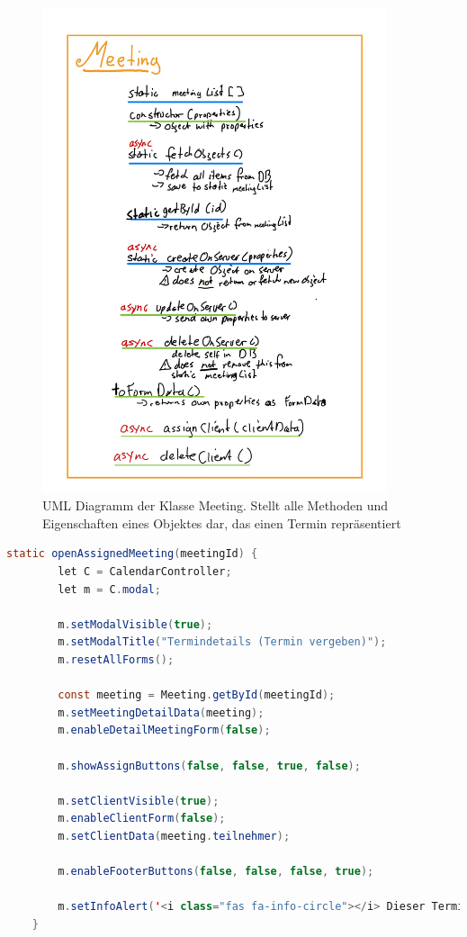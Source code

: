 \documentclass[12pt]{article}
\begin{document}
\begin{figure}[h]
    \caption{UML Diagramm der Klasse Meeting. Stellt alle Methoden und Eigenschaften eines Objektes dar, das einen Termin repräsentiert}
    \centering
    \includegraphics[width=0.9\textwidth]{uml_meeting.jpeg}
\end{figure}

\begin{lstlisting}[language=Java]
    static openAssignedMeeting(meetingId) {
        let C = CalendarController;
        let m = C.modal;

        m.setModalVisible(true);
        m.setModalTitle("Termindetails (Termin vergeben)");
        m.resetAllForms();

        const meeting = Meeting.getById(meetingId);
        m.setMeetingDetailData(meeting);
        m.enableDetailMeetingForm(false);

        m.showAssignButtons(false, false, true, false);

        m.setClientVisible(true);
        m.enableClientForm(false);
        m.setClientData(meeting.teilnehmer);

        m.enableFooterButtons(false, false, false, true);

        m.setInfoAlert('<i class="fas fa-info-circle"></i> Dieser Termin ist bereits an einen Kunden vergeben. Bearbeiten des Termins ist nur moeglich, nachdem die Kundendaten geloescht wurden.');
    }
\end{lstlisting}
\end{document}
